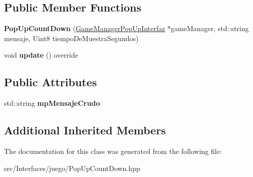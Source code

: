 \subsection*{Public Member Functions}
\begin{DoxyCompactItemize}
\item 
{\bfseries Pop\+Up\+Count\+Down} (\hyperlink{class_game_manager_pop_up_interfaz}{Game\+Manager\+Pop\+Up\+Interfaz} $\ast$game\+Manager, std\+::string mensaje, Uint8 tiempo\+De\+Muestra\+Segundos)\hypertarget{class_pop_up_count_down_a0cf06e61e6712f29c39ff410fc930c6a}{}\label{class_pop_up_count_down_a0cf06e61e6712f29c39ff410fc930c6a}

\item 
void {\bfseries update} () override\hypertarget{class_pop_up_count_down_a031b32f4dd22602dcc16c126ff597c1f}{}\label{class_pop_up_count_down_a031b32f4dd22602dcc16c126ff597c1f}

\end{DoxyCompactItemize}
\subsection*{Public Attributes}
\begin{DoxyCompactItemize}
\item 
std\+::string {\bfseries mp\+Mensaje\+Crudo}\hypertarget{class_pop_up_count_down_aef27ba85166fd2481cfb2d3449198746}{}\label{class_pop_up_count_down_aef27ba85166fd2481cfb2d3449198746}

\end{DoxyCompactItemize}
\subsection*{Additional Inherited Members}


The documentation for this class was generated from the following file\+:\begin{DoxyCompactItemize}
\item 
src/\+Interfaces/juego/Pop\+Up\+Count\+Down.\+hpp\end{DoxyCompactItemize}
